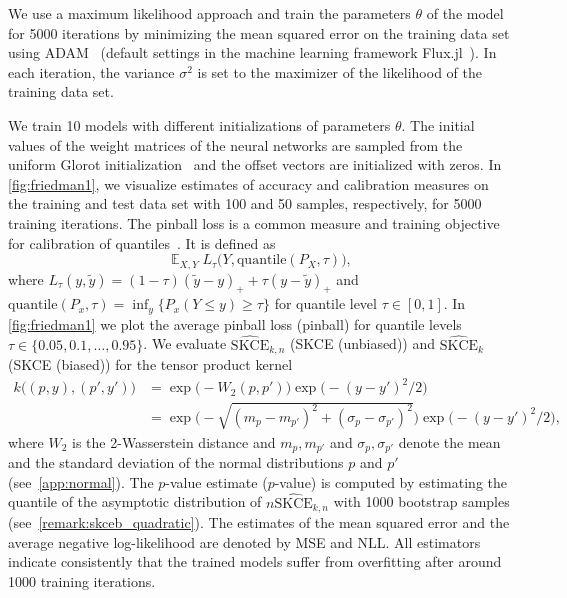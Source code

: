 \documentclass{article}
\DeclareMathOperator{\Exp}{\mathbb{E}}
\begin{document}
We use a maximum likelihood approach and train the parameters $\theta$ of the model
for 5000 iterations by minimizing the mean squared error on the training data set
using ADAM~\citep{Kingma2015} (default settings in the machine learning
framework Flux.jl~\citep{Innes2018a,Innes2018b}). In each iteration, the
variance $\sigma^2$ is set to the maximizer of the likelihood of the training data
set.

We train 10 models with different initializations of parameters $\theta$. The initial values
of the weight matrices of the neural networks are sampled from the uniform Glorot
initialization~\citep{Glorot2010} and the offset vectors are initialized with zeros.
In \cref{fig:friedman1}, we visualize estimates of accuracy and calibration measures
on the training and test data set with 100 and 50 samples, respectively, for
5000 training iterations. The pinball loss is a common measure and
training objective for calibration of quantiles~\citep{Song2019}. It is defined
as
\begin{equation*}
    \Exp_{X,Y} L_{\tau}\big(Y, \mathrm{quantile}(P_X, \tau)\big),
\end{equation*}
where $L_{\tau}(y, \tilde{y}) = (1 - \tau) (\tilde{y} - y)_{+} + \tau (y - \tilde{y})_{+}$
and $\mathrm{quantile}(P_x, \tau) = \inf_{y} \{P_x(Y \leq y) \geq \tau\}$ for
quantile level $\tau \in [0, 1]$.
In \cref{fig:friedman1} we plot the average pinball loss (pinball) for
quantile levels $\tau \in \{0.05, 0.1, \ldots, 0.95\}$. We evaluate
$\widehat{\mathrm{SKCE}}_{k,n}$ (SKCE (unbiased)) and $\widehat{\mathrm{SKCE}}_{k}$
(SKCE (biased)) for the tensor product kernel
\begin{equation*}
    \begin{split}
        k\big((p, y), (p', y')\big) &= \exp{\big(-W_2(p, p')\big)} \exp{\big(-(y - y')^2/2 \big)} \\
        &= \exp{\bigg(-\sqrt{(m_p - m_{p'})^2 + (\sigma_p - \sigma_{p'})^2}\bigg)} \exp{\big(- (y - y')^2/2\big)},
    \end{split}
\end{equation*}
where $W_2$ is the 2-Wasserstein distance and $m_p, m_{p'}$ and $\sigma_p, \sigma_{p'}$ denote
the mean and the standard deviation of the normal distributions $p$ and $p'$ (see~\cref{app:normal}).
The $p$-value estimate ($p$-value) is computed by estimating the quantile of the asymptotic distribution
of $n \widehat{\mathrm{SKCE}}_{k,n}$ with 1000 bootstrap samples
(see~\cref{remark:skceb_quadratic}). The estimates of the mean squared error
and the average negative log-likelihood are denoted by MSE and NLL.
All estimators indicate consistently that the trained models suffer from overfitting
after around 1000 training iterations.
\end{document}
